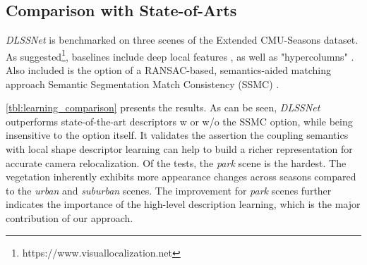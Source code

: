 \subsection{Comparison with State-of-Arts}
{\em DLSSNet} is benchmarked on three scenes of the Extended CMU-Seasons dataset. 
As suggested\footnote{https://www.visuallocalization.net}, baselines include deep local features 
\cite{detone2018superpoint,dusmanu2019d2,revaud2019r2d2,luo2020aslfeat}, 
as well as "hypercolumns" \cite{fathy2018hierarchical, spencer2019scale}. 
Also included is the option of a RANSAC-based, semantics-aided matching approach Semantic Segmentation Match Consistency (SSMC) 
\cite{toft2018semantic}.

\ref{tbl:learning_comparison} presents the results. 
As can be seen, {\em DLSSNet} outperforms state-of-the-art descriptors w or w/o the SSMC option, while being insensitive to the option itself. 
It validates the assertion the coupling semantics with local shape descriptor learning can help to build a richer representation for accurate camera relocalization. 
Of the tests, the \textit{park} scene is the hardest. 
The vegetation inherently exhibits more appearance changes across seasons compared to the \textit{urban} and \textit{suburban} scenes. 
The improvement for \textit{park} scenes further indicates the importance of the high-level description learning, which is the major contribution of our approach.

